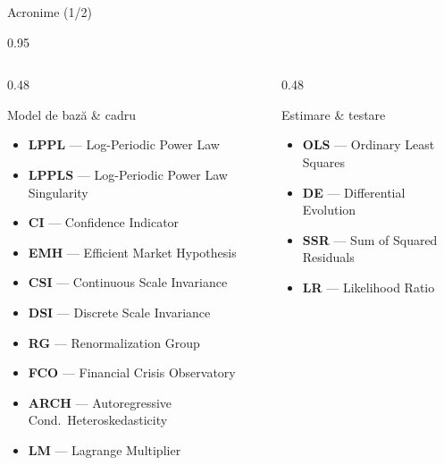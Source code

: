 \documentclass[9pt, aspectratio=169, t]{beamer}
\begin{document}

\begin{frame}{Acronime (1/2)}
    \begin{cminipage}{0.95\textwidth}
    {\scriptsize
    \begin{columns}[T]
        \begin{column}{0.48\textwidth}
            \begin{block}{Model de bază \& cadru}
                \begin{itemize}\setlength{\itemsep}{0pt}
                    \item \textbf{LPPL} --- Log-Periodic Power Law
                    \item \textbf{LPPLS} --- Log-Periodic Power Law Singularity
                    \item \textbf{CI} --- Confidence Indicator
                    \item \textbf{EMH} --- Efficient Market Hypothesis
                    \item \textbf{CSI} --- Continuous Scale Invariance
                    \item \textbf{DSI} --- Discrete Scale Invariance
                    \item \textbf{RG} --- Renormalization Group
                    \item \textbf{FCO} --- Financial Crisis Observatory
                    \item \textbf{ARCH} --- Autoregressive Cond.\ Heteroskedasticity
                    \item \textbf{LM} --- Lagrange Multiplier
                \end{itemize}
            \end{block}
        \end{column}
        \begin{column}{0.48\textwidth}
            \begin{exampleblock}{Estimare \& testare}
                \begin{itemize}\setlength{\itemsep}{0pt}
                    \item \textbf{OLS} --- Ordinary Least Squares
                    \item \textbf{DE} --- Differential Evolution
                    \item \textbf{SSR} --- Sum of Squared Residuals
                    \item \textbf{LR} --- Likelihood Ratio

\end{itemize}
\end{exampleblock}
\end{column}
\end{columns}}
\end{cminipage}
\end{frame}
\end{document}
